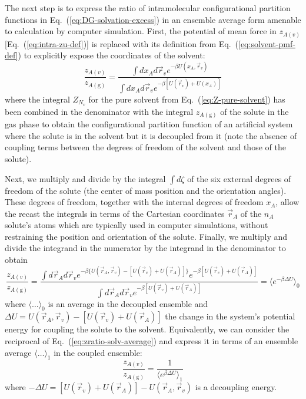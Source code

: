 \documentclass[9pt,bestpractices]{livecoms}
\begin{document}
The next step is to express the ratio of intramolecular configurational partition functions in Eq.~(\ref{eq:DG-solvation-excess}) in an ensemble average form amenable to calculation by computer simulation. First, the potential of mean force in $z_{A(v)}$ [Eq.~(\ref{eq:intra-zu-def})] is replaced with its definition from Eq.~(\ref{eq:solvent-pmf-def}) to explicitly expose the coordinates of the solvent:
\begin{equation}
  \frac{z_{A(v)}}{z_{A(\mathrm{g})}} =
  \frac{
    \int dx_A d\vec{r}_v e^{-\beta U(x_A, \vec{r}_v)}
  }{
    \int dx_A d\vec{r}_v e^{-\beta [U(\vec{r}_v) + U(x_A)] }
  }
\end{equation}
where the integral $Z_{N_v}$ for the pure solvent from Eq.~(\ref{eq:Z-pure-solvent}) has been combined in the denominator with the integral $z_{A(\mathrm{g})}$ of the solute in the gas phase to obtain the configurational partition function of an artificial system where the solute is in the solvent but it is decoupled from it (note the absence of coupling terms between the degrees of freedom of the solvent and those of the solute).

Next, we multiply and divide by the integral $\int d\zeta$ of the six external degrees of freedom of the solute (the center of mass position and the orientation angles). These degrees of freedom, together with the internal degrees of freedom $x_A$, allow the recast the integrals in terms of the Cartesian coordinates $\vec{r}_A$ of the $n_A$ solute's atoms which are typically used in computer simulations, without restraining the position and orientation of the solute. Finally, we multiply and divide the integrand in the numerator by the integrand in the denominator to obtain
\begin{equation}
  \frac{z_{A(v)}}{z_{A(\mathrm{g})}} =
  \frac{
    \int d\vec{r}_A  d\vec{r}_v  e^{-\beta \{ U(\vec{r}_A, \vec{r}_v) -  [ U(\vec{r}_v) + U(\vec{r}_A) ] \}} e^{-\beta [U(\vec{r}_v) + U(  \vec{r}_A  )] } 
  }{
    \int d\vec{r}_A d\vec{r}_v e^{-\beta [U(\vec{r}_v) + U( \vec{r}_A  )] } 
  } = \langle e^{-\beta \Delta U} \rangle_0
  \label{eq:zratio-solv-average}
\end{equation}
where $\langle \ldots \rangle_0$ is an average in the decoupled ensemble and $\Delta U =  U(\vec{r}_A , \vec{r}_v) -  [ U(\vec{r}_v) + U(\vec{r}_A ) ]$ the change in the system's potential energy for coupling the solute to the solvent. Equivalently, we can consider the reciprocal of Eq.~(\ref{eq:zratio-solv-average}) and express it in terms of an ensemble average $\langle \ldots \rangle_1$ in the coupled ensemble:
\begin{equation}
  \frac{z_{A(v)}}{z_{A(\mathrm{g})}} = \frac{1}{\langle e^{\beta \Delta U} \rangle_1}
\end{equation}
where $-\Delta U = [ U(\vec{r}_v) + U(\vec{r}_A ) ] - U(\vec{r}_A , \vec{r}_v)$ is a decoupling energy.
\end{document}
